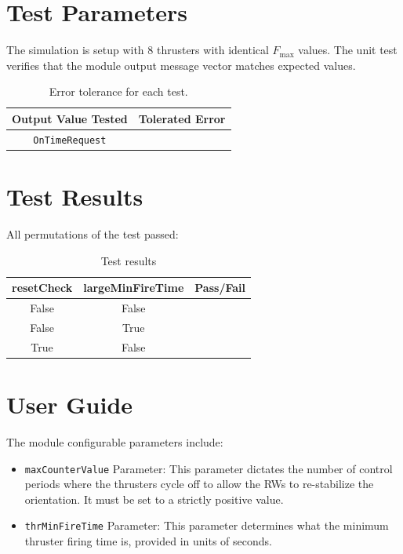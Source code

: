 \documentclass[]{BasiliskReportMemo}
\begin{document}
\section{Test Parameters}
The simulation is setup with 8 thrusters  with identical $F_{\text{max}}$ values.  
The unit test verifies that the module output  message vector matches expected values.
\begin{table}[htbp]
	\caption{Error tolerance for each test.}
	\label{tab:errortol}
	\centering \fontsize{10}{10}\selectfont
	\begin{tabular}{ c | c } %
		\hline\hline
		\textbf{Output Value Tested}  & \textbf{Tolerated Error}  \\ 
		\hline
		{\tt OnTimeRequest}        & 	   \\ 
		\hline\hline
	\end{tabular}
\end{table}




\section{Test Results}
All permutations of the test passed:
\begin{table}[h]
	\caption{Test results}
	\label{tab:results}
	\centering \fontsize{10}{10}\selectfont
	\begin{tabular}{c | c | c  } %
		\hline\hline
		\textbf{resetCheck} & \textbf{largeMinFireTime}	&\textbf{Pass/Fail} \\ 
		\hline
	   False & 	  False 			&  \\ 
	   False & True	   			&  \\ 
	   True & False 	   			&  \\ 
	   \hline\hline
	\end{tabular}
\end{table}









\section{User Guide}
The module configurable parameters include:
\begin{itemize}
	\item {{\tt maxCounterValue} Parameter}: 
This parameter dictates the number of control periods where the thrusters cycle off to allow the RWs to re-stabilize the orientation.  It must be set to a strictly positive value.  

	\item {{\tt thrMinFireTime} Parameter}: 
This parameter determines what the minimum thruster firing time is, provided in units of seconds.  
\end{itemize}
\end{document}

